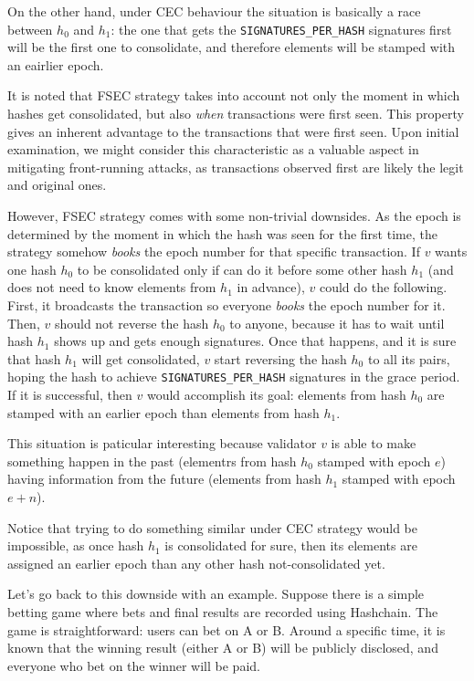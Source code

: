 On the other hand, under CEC behaviour the situation is basically a race between
$h_0$ and $h_1$: the one that gets the \texttt{SIGNATURES\_PER\_HASH} signatures first will
be the first one to consolidate, and therefore elements will be stamped with an eairlier epoch.

It is noted that FSEC strategy takes into account
not only the
moment in which hashes get consolidated, but also \textit{when} transactions were first seen.
This property gives an inherent advantage to the transactions that were first seen.
Upon initial examination, we might consider this characteristic as a valuable aspect in
mitigating front-running attacks, as transactions observed first are likely the legit
and original ones.

However, FSEC strategy comes with some non-trivial downsides.
As the epoch is determined by the moment in which the hash was seen for the first time,
the strategy somehow \textit{books} the epoch number for that specific transaction.
If $v$ wants one hash $h_0$ to be consolidated only if can do it before some other 
hash $h_1$ (and does not need to know elements from $h_1$ in advance),
$v$ could do the following. First, it broadcasts the transaction so
everyone \textit{books}
the epoch number for it.
Then, $v$ should not reverse the hash $h_0$ to anyone, because it has to wait until hash
$h_1$ shows up and gets enough signatures.
Once that happens, and it is sure that hash
$h_1$ will get consolidated, $v$ start reversing the hash $h_0$ to all its pairs, hoping the
hash to achieve \texttt{SIGNATURES\_PER\_HASH} signatures in the grace period.
If it is successful, then $v$ would accomplish its goal:
elements from hash $h_0$ are stamped with an earlier epoch than elements from
hash $h_1$.

This situation is paticular interesting because validator $v$ is able to make something
happen in the past (elementrs from hash $h_0$ stamped with epoch $e$) having information
from the future (elements from hash $h_1$ stamped with epoch $e+n$).

Notice that trying to do something similar under CEC strategy would be impossible, as once
hash $h_1$ is consolidated for sure, then its elements are assigned an earlier epoch than any
other hash not-consolidated yet.

Let's go back to this downside with an example. Suppose there is a simple betting game where bets and
final results are recorded using Hashchain. The game is straightforward: users can
bet on A or B. Around a specific time, it is known that the winning result (either A or B)
will be publicly disclosed, and everyone who bet on the winner will be paid.

